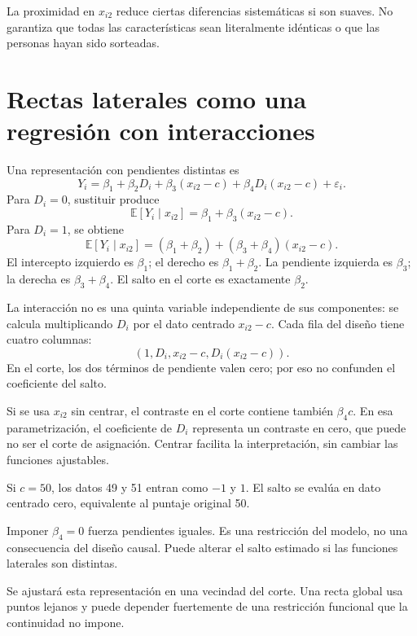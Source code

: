\documentclass[11pt,a4paper]{article}
\newcommand{\E}{\mathbb E}
\begin{document}
La proximidad en \(x_{i2}\) reduce ciertas
diferencias sistemáticas si son suaves.
No garantiza que todas las características
sean literalmente idénticas o que
las personas hayan sido sorteadas.

\clearpage
\section{Rectas laterales como una regresión con interacciones}\label{unidad22}
Una representación con pendientes distintas es
\[
Y_i=\beta_1+\beta_2D_i+\beta_3(x_{i2}-c)
+\beta_4D_i(x_{i2}-c)+\varepsilon_i.
\]
Para \(D_i=0\), sustituir produce
\[
\E[Y_i\mid x_{i2}]=\beta_1+\beta_3(x_{i2}-c).
\]
Para \(D_i=1\), se obtiene
\[
\E[Y_i\mid x_{i2}]
=(\beta_1+\beta_2)+(\beta_3+\beta_4)(x_{i2}-c).
\]
El intercepto izquierdo es \(\beta_1\);
el derecho es \(\beta_1+\beta_2\).
La pendiente izquierda es \(\beta_3\);
la derecha es \(\beta_3+\beta_4\).
El salto en el corte es exactamente \(\beta_2\).

La interacción no es una quinta variable
independiente de sus componentes:
se calcula multiplicando \(D_i\)
por el dato centrado \(x_{i2}-c\).
Cada fila del diseño tiene cuatro columnas:
\[
(1,D_i,x_{i2}-c,D_i(x_{i2}-c)).
\]
En el corte, los dos términos de pendiente
valen cero; por eso no confunden el
coeficiente del salto.

Si se usa \(x_{i2}\) sin centrar, el contraste
en el corte contiene también \(\beta_4c\).
En esa parametrización, el coeficiente de
\(D_i\) representa un contraste en cero,
que puede no ser el corte de asignación.
Centrar facilita la interpretación,
sin cambiar las funciones ajustables.

\begin{ejemplo}
Si \(c=50\), los datos 49 y 51
entran como \(-1\) y \(1\).
El salto se evalúa en dato centrado cero,
equivalente al puntaje original 50.
\end{ejemplo}
Imponer \(\beta_4=0\) fuerza pendientes iguales.
Es una restricción del modelo,
no una consecuencia del diseño causal.
Puede alterar el salto estimado si
las funciones laterales son distintas.

Se ajustará esta representación en una
vecindad del corte. Una recta global
usa puntos lejanos y puede depender
fuertemente de una restricción funcional
que la continuidad no impone.

\clearpage
\end{document}
